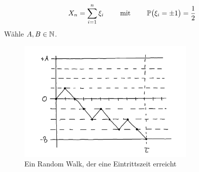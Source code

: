 \begin{beisp}
	\begin{align*}
		X_n=\sum\limits_{i=1}^n \xi_i\qquad\mit\qquad \P\big(\xi_i=\pm 1\big)=\frac{1}{2}
	\end{align*}
	Wähle $A,B\in\N$.
	\begin{figure}[!ht]
		\center
		\includegraphics[width=0.75\textwidth]{./pics/Sketch0.png}
		\caption{Ein Random Walk, der eine Eintrittszeit erreicht}
		\label{AbbEintrittszeit}
	\end{figure}


\end{beisp}
